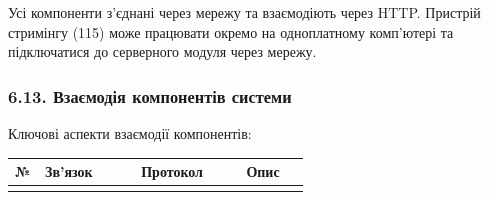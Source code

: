 \documentclass[12pt,a4paper]{article}
\begin{document}
Усі компоненти з'єднані через мережу та взаємодіють через HTTP. Пристрій стримінгу (115) може працювати окремо на одноплатному комп'ютері та підключатися до серверного модуля через мережу.



\subsubsection{6.13. Взаємодія компонентів системи}\label{ux432ux437ux430ux454ux43cux43eux434ux456ux44f-ux43aux43eux43cux43fux43eux43dux435ux43dux442ux456ux432-ux441ux438ux441ux442ux435ux43cux438}



Ключові аспекти взаємодії компонентів:



{\def\LTcaptype{none} %

\begin{longtable}[]{@{}

  >{\raggedright\arraybackslash}p{0.1071\linewidth}

  >{\raggedright\arraybackslash}p{0.3214\linewidth}

  >{\raggedright\arraybackslash}p{0.3571\linewidth}

  >{\raggedright\arraybackslash}p{0.2143\linewidth}@{}}

\toprule\noalign{}

\begin{minipage}[b]{\linewidth}\raggedright

№

\end{minipage} & \begin{minipage}[b]{\linewidth}\raggedright

Зв'язок

\end{minipage} & \begin{minipage}[b]{\linewidth}\raggedright

Протокол

\end{minipage} & \begin{minipage}[b]{\linewidth}\raggedright

Опис

\end{minipage} \\

\midrule\noalign{}

\endhead

\bottomrule\noalign{}


\end{longtable}}
\end{document}
